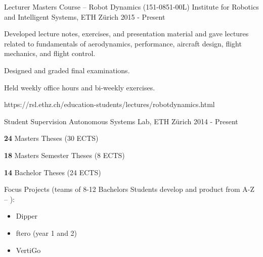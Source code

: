 \label{sec:teaching}
\begin{cventries}


\cvprojwideentry
  	{Lecturer} %
  	{Masters Course -- Robot Dynamics (151-0851-00L)} %
    {Institute for Robotics and Intelligent Systems, ETH Z\"{u}rich} %
    {2015 - Present} %
    {
      \begin{cvitems} %
        \item Developed lecture notes, exercises, and presentation material and gave lectures related to fundamentals of aerodynamics, performance, aircraft design, flight mechanics, and flight control.
		\item Designed and graded final examinations.
		\item Held weekly office hours and bi-weekly exercises.
      \end{cvitems}
    } %
    {https://rsl.ethz.ch/education-students/lectures/robotdynamics.html} %
    {\showprojectdescriptions}
    {}

\cvprojwideentry
  	{Student Supervision} %
  	{} %
    {Autonomous Systems Lab, ETH Z\"{u}rich} %
    {2014 - Present} %
    {
      \begin{cvitems} %
        \item \textbf{24} Masters Theses (30 ECTS)
		\item \textbf{18} Masters Semester Theses (8 ECTS)
		\item \textbf{14} Bachelor Theses (24 ECTS)
		\item Focus Projects (teams of 8-12 Bachelors Students develop and product from A-Z -- ):
		\begin{itemize}[label=-]
			\item Dipper 
			\item ftero (year 1 and 2) 
			\item VertiGo 	
		\end{itemize}
      \end{cvitems}
    } %
    {} %
    {\showprojectdescriptions}
    {}
    

\end{cventries}
